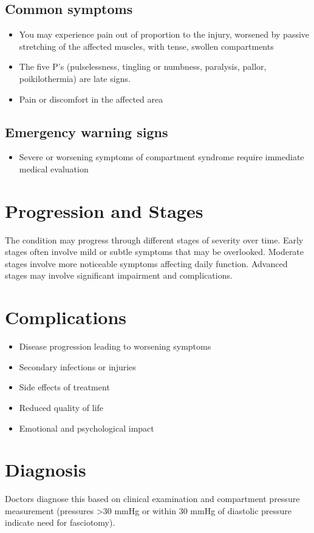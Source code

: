 \subsection{Common symptoms}
\begin{itemize}[noitemsep]
  \item You may experience pain out of proportion to the injury, worsened by passive stretching of the affected muscles, with tense, swollen compartments
  \item The five P's (pulselessness, tingling or numbness, paralysis, pallor, poikilothermia) are late signs.
  \item Pain or discomfort in the affected area
  \end{itemize}

\subsection{Emergency warning signs}
\begin{itemize}[noitemsep]
  \item Severe or worsening symptoms of compartment syndrome require immediate medical evaluation
\end{itemize}
\section{Progression and Stages}
The condition may progress through different stages of severity over time. Early stages often involve mild or subtle symptoms that may be overlooked. Moderate stages involve more noticeable symptoms affecting daily function. Advanced stages may involve significant impairment and complications.
\section{Complications}
\begin{itemize}[noitemsep]
  \item Disease progression leading to worsening symptoms
  \item Secondary infections or injuries
  \item Side effects of treatment
  \item Reduced quality of life
  \item Emotional and psychological impact
\end{itemize}
\section{Diagnosis}
Doctors diagnose this based on clinical examination and compartment pressure measurement (pressures >30 mmHg or within 30 mmHg of diastolic pressure indicate need for fasciotomy).

